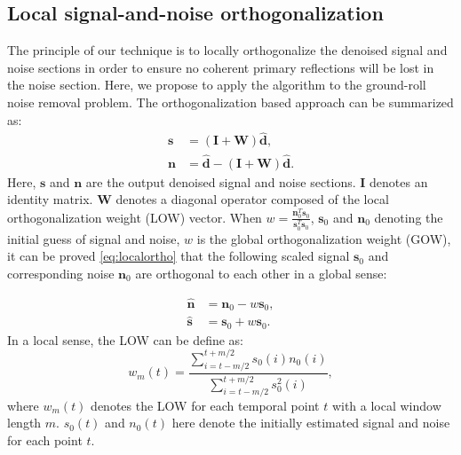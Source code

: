 \subsection{Local signal-and-noise orthogonalization}
The principle of our technique is to locally orthogonalize the denoised signal and noise sections in order to ensure no coherent primary reflections will be lost in the noise section. %
Here, we propose to apply the algorithm to the ground-roll noise removal problem. The orthogonalization based approach can be summarized as: 
\begin{align}
\label{eq:news}
\mathbf{s}&=(\mathbf{I}+\mathbf{W})\mathbf{\hat{d}},\\
\label{eq:newn}
\mathbf{n}&=\mathbf{\hat{d}}-(\mathbf{I}+\mathbf{W})\mathbf{\hat{d}}.
\end{align}
Here, $\mathbf{s}$ and $\mathbf{n}$ are the output denoised signal and noise sections. $\mathbf{I}$ denotes an identity matrix. $\mathbf{W}$ denotes a diagonal operator composed of the local orthogonalization weight (LOW) vector.  When $w=\frac{\mathbf{n}_0^T\mathbf{s}_0}{\mathbf{s}_0^T\mathbf{s}_0}$, $\mathbf{s}_0$ and $\mathbf{n}_0$ denoting the initial guess of signal and noise, $w$ is the global orthogonalization weight (GOW), it can be proved \ref{eq:localortho} that the following scaled signal $\mathbf{s}_0$ and corresponding noise $\mathbf{n}_0$ are orthogonal to each other in a global sense: %

\begin{align}
\label{eq:ortho1}
\hat{\mathbf{n}} &= \mathbf{n}_0 - w\mathbf{s}_0, \\
\label{eq:ortho2}
\hat{\mathbf{s}} &= \mathbf{s}_0 + w\mathbf{s}_0.
\end{align}
In a local sense, the LOW can be define as:
      \begin{equation}
        \label{eq:eq2}
          w_m(t) = \frac{\displaystyle\sum_{i=t-m/2}^{t+m/2} s_0(i) n_0(i)}{\displaystyle\sum_{i=t-m/2}^{t+m/2} s_0^2(i)},
      \end{equation}
where $w_m(t)$ denotes the LOW for each temporal point $t$ with a local window length $m$. $s_0(t)$ and $n_0(t)$ here denote the initially estimated signal and noise for each point $t$.


